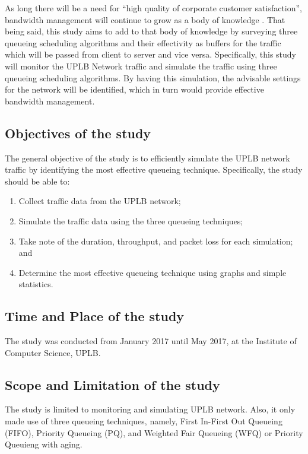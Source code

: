 \documentclass[journal]{IEEE/IEEEtran}
\begin{document}
As long there will be a need for “high quality of corporate customer satisfaction”, bandwidth management will continue to grow as a body of knowledge \cite{duzbeck_2006}. That being said, this study aims to add to that body of knowledge by surveying three queueing scheduling algorithms and their effectivity as buffers for the traffic which will be passed from client to server and vice versa. Specifically, this study will monitor the UPLB Network traffic and simulate the traffic \clearpage using three queueing scheduling algorithms. By having this simulation, the advisable settings for the network will be identified, which in turn would provide effective bandwidth management.

\subsection{Objectives of the study}
The general objective of the study is to efficiently simulate the UPLB network traffic by identifying the most effective queueing technique. Specifically, the study should be able to:

\begin{enumerate}
\item Collect traffic data from the UPLB network;
\item Simulate the traffic data using the three queueing techniques;
\item Take note of the duration, throughput, and packet loss for each simulation; and
\item Determine the most effective queueing technique using graphs and simple statistics.
\end{enumerate}

\subsection{Time and Place of the study}
The study was conducted from January 2017 until May 2017, at the Institute of Computer Science, UPLB.

\subsection{Scope and Limitation of the study}
The study is limited to monitoring and simulating UPLB network. Also, it only made use of three queueing techniques, namely, First In-First Out Queueing (FIFO), Priority Queueing (PQ), and Weighted Fair Queueing (WFQ) or Priority Queuieng with aging.
\end{document}
